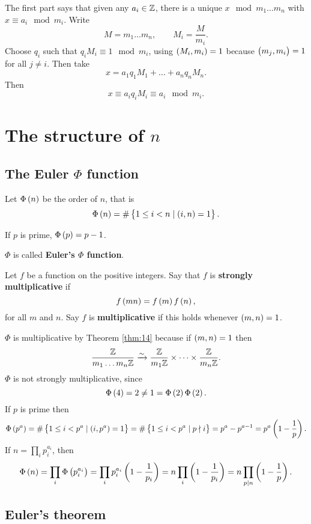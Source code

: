 The first part says that given any $ a_i \in \mathbb{Z} $, there is a unique $ x \mod m_1 \dots m_n $ with $ x \equiv a_i \mod m_i $. Write
$$ M = m_1 \dots m_n, \qquad M_i = \dfrac{M}{m_i}. $$
Choose $ q_i $ such that $ q_iM_i \equiv 1 \mod m_i $, using $ \br{M_i, m_i} = 1 $ because $ \br{m_j, m_i} = 1 $ for all $ j \ne i $. Then take
$$ x = a_1q_1M_1 + \dots + a_nq_nM_n. $$
Then
$$ x \equiv a_iq_iM_i \equiv a_i \mod m_i. $$

\pagebreak

\section{The structure of $ \unit{n} $}

\subsection{The Euler $ \Phi $ function}

Let $ \Phi\br{n} $ be the order of $ \unit{n} $, that is
$$ \Phi\br{n} = \#\cbr{1 \le i < n \mid \br{i, n} = 1}. $$

\begin{example*}
If $ p $ is prime, $ \Phi\br{p} = p - 1 $.
\end{example*}

$ \Phi $ is called \textbf{Euler's $ \Phi $ function}.

\begin{definition}
Let $ f $ be a function on the positive integers. Say that $ f $ is \textbf{strongly multiplicative} if
$$ f\br{mn} = f\br{m}f\br{n}, $$
for all $ m $ and $ n $. Say $ f $ is \textbf{multiplicative} if this holds whenever $ \br{m, n} = 1 $.
\end{definition}

$ \Phi $ is multiplicative by Theorem \ref{thm:14} because if $ \br{m, n} = 1 $ then
$$ \dfrac{\mathbb{Z}}{m_1 \dots m_n\mathbb{Z}} \xrightarrow{\sim} \dfrac{\mathbb{Z}}{m_1\mathbb{Z}} \times \dots \times \dfrac{\mathbb{Z}}{m_n\mathbb{Z}}. $$
$ \Phi $ is not strongly multiplicative, since
$$ \Phi\br{4} = 2 \ne 1 = \Phi\br{2}\Phi\br{2}. $$
If $ p $ is prime then
$$ \Phi\br{p^a} = \#\cbr{1 \le i < p^a \mid \br{i, p^a} = 1} = \#\cbr{1 \le i < p^a \mid p \nmid i} = p^a - p^{a - 1} = p^a\br{1 - \dfrac{1}{p}}. $$
If $ n = \prod_i p_i^{a_i} $, then
$$ \Phi\br{n} = \prod_i \Phi\br{p_i^{a_i}} = \prod_i p_i^{a_i}\br{1 - \dfrac{1}{p_i}} = n\prod_i \br{1 - \dfrac{1}{p_i}} = n\prod_{p \mid n} \br{1 - \dfrac{1}{p}}. $$

\subsection{Euler's theorem}

